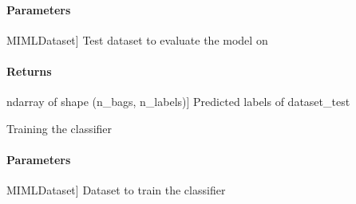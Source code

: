\documentclass[letterpaper,10pt,english]{sphinxmanual}
\begin{document}
\begin{fulllineitems}
\begin{fulllineitems}
\paragraph{Parameters}
\label{\detokenize{classifier/mimlTOml/_autosummary/miml.classifier.mimlTOml.miml_to_ml_classifier.MIMLtoMLClassifier:parameters}}\begin{description}
\sphinxlineitem{dataset\_test}{[}MIMLDataset{]}
\sphinxAtStartPar
Test dataset to evaluate the model on

\end{description}


\paragraph{Returns}
\label{\detokenize{classifier/mimlTOml/_autosummary/miml.classifier.mimlTOml.miml_to_ml_classifier.MIMLtoMLClassifier:returns}}\begin{description}
\sphinxlineitem{results}{[}ndarray of shape (n\_bags, n\_labels){]}
\sphinxAtStartPar
Predicted labels of dataset\_test

\end{description}

\end{fulllineitems}


\begin{fulllineitems}
\label{\detokenize{classifier/mimlTOml/_autosummary/miml.classifier.mimlTOml.miml_to_ml_classifier.MIMLtoMLClassifier:miml.classifier.mimlTOml.miml_to_ml_classifier.MIMLtoMLClassifier.fit}}
\pysigstartsignatures
{}
\pysigstopsignatures
\sphinxAtStartPar
Training the classifier


\paragraph{Parameters}
\label{\detokenize{classifier/mimlTOml/_autosummary/miml.classifier.mimlTOml.miml_to_ml_classifier.MIMLtoMLClassifier:id1}}\begin{description}
\sphinxlineitem{dataset\_train}{[}MIMLDataset{]}
\sphinxAtStartPar
Dataset to train the classifier


\end{description}
\end{fulllineitems}
\end{fulllineitems}
\end{document}
